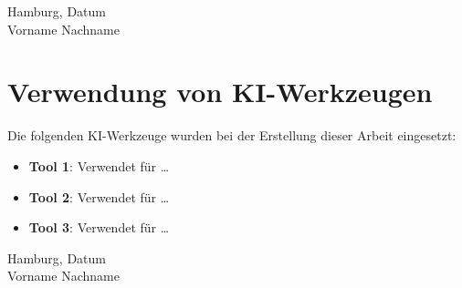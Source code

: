 \documentclass[11pt,a4paper]{article}
\begin{document}
\vspace{2cm}
\begin{flushleft}
Hamburg, Datum \\
\vspace{0.5cm}
Vorname Nachname \end{flushleft}

\newpage
\section*{Verwendung von KI-Werkzeugen}


Die folgenden KI-Werkzeuge wurden bei der Erstellung dieser Arbeit eingesetzt:

\begin{itemize}
	\item \textbf{Tool 1}: Verwendet für \ldots
	\item \textbf{Tool 2}: Verwendet für \ldots
	\item \textbf{Tool 3}: Verwendet für \ldots
\end{itemize}

\vspace{2cm}
\begin{flushleft}
Hamburg, Datum \\
\vspace{0.5cm}
Vorname Nachname \end{flushleft}
\end{document}
